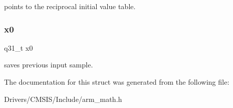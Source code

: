 points to the reciprocal initial value table. \mbox{\label{structarm__lms__norm__instance__q31_a973b8350a0c7b113a5f002bc0b86bf76}} 
\subsubsection{\texorpdfstring{x0}{x0}}
{\footnotesize\ttfamily q31\+\_\+t x0}

saves previous input sample. 

The documentation for this struct was generated from the following file\+:\begin{DoxyCompactItemize}
\item 
Drivers/\+C\+M\+S\+I\+S/\+Include/arm\+\_\+math.\+h\end{DoxyCompactItemize}
